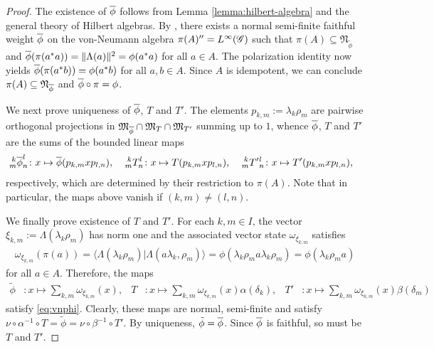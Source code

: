 \begin{proof}
  The existence of $\vnphi$ follows from Lemma
  \ref{lemma:hilbert-algebra} and the general theory of Hilbert
  algebras. By \cite{}, there exists a normal semi-finite faithful
  weight $\vnphi$ on the von-Neumann algebra $\pi(A)''=\LGinf$ such that
  $\pi(A) \subseteq \mathfrak{N}_{\tilde \phi}$ and
  $\vnphi(\pi(a^{*}a))=\|\Lambda(a)\|^{2}=\phi(a^{*}a)$ for all $a\in
  A$. The polarization identity now yields $\vnphi(\pi(a^{*}b)) =
  \phi(a^{*}b)$ for all $a,b\in A$. Since $A$ is idempotent, we can
  conclude $\pi(A) \subseteq \mathfrak{N}_{\vnphi}$ and $\vnphi\circ
  \pi=\phi$.

  We next prove uniqueness of $\vnphi$, $T$ and $T'$.  The elements
  $p_{k,m}:=\lambda_{k}\rho_{m}$ are pairwise orthogonal
  projections in $\mathfrak{M}_{\vnphi} \cap \mathfrak{M}_{T} \cap
  \mathfrak{M}_{T'}$ summing up to $1$, whence $\vnphi$, $T$ and $T'$
  are the sums of the bounded linear maps
  \begin{align*}
    \Gr{\vnphi}{k}{l}{m}{n}&\colon x\mapsto \vnphi(p_{k,m}xp_{l,n}),  &
    \Gr{T}{k}{l}{m}{n} &\colon x \mapsto T(p_{k,m}xp_{l,n}), &
    \Gr{T'{}}{k}{l}{m}{n} &\colon x\mapsto T'(p_{k,m}xp_{l,n}),
  \end{align*}
  respectively, which are determined by their restriction to
  $\pi(A)$. Note that in particular, the maps above vanish if
  $(k,m)\neq (l,n)$.
  
  We finally prove existence of $T$ and $T'$. For each $k,m\in I$, the vector
  $\xi_{k,m}:=\Lambda(\lambda_{k}\rho_{m})$ has norm one and the
  associated vector state $\omega_{\xi_{k,m}}$ satisfies
  \begin{align*}
    \omega_{\xi_{k,m}}(\pi(a))= \langle
    \Lambda(\lambda_{k}\rho_{m})|\Lambda(a\lambda_{k},\rho_{m})\rangle
    = \phi(\lambda_{k}\rho_{m}a\lambda_{k}\rho_{m} )=
    \phi(\lambda_{k}\rho_{m}a)
  \end{align*}
  for all $a\in A$. Therefore, the maps
  \begin{align} \label{eq:vnphi-explicit}
\tilde\phi&\colon x\mapsto\sum_{k,m} \omega_{\xi_{k,m}}(x), &
    T&\colon x\mapsto \sum_{k,m}
    \omega_{\xi_{k,m}}(x)\alpha(\delta_{k}), & T'&\colon x\mapsto
    \sum_{k,m} \omega_{\xi_{k,m}}(x) \beta(\delta_{m})
  \end{align}
  satisfy \eqref{eq:vnphi}. Clearly, these maps are normal,
  semi-finite and satisfy $\nu \circ \alpha^{-1}\circ T = \tilde\phi = \nu
  \circ \beta^{-1} \circ T'$.  By uniqueness, $\tilde
  \phi=\vnphi$. Since $\vnphi$ is faithful, so must be $T$ and $T'$.
\end{proof}
